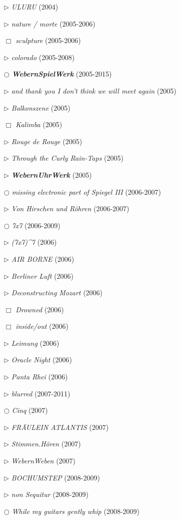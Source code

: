 \documentclass[a4paper,12pt]{article}
\begin{document}
\begin{itemize}
\item[$\rhd$] \emph{ULURU} (2004)
\item[$\rhd$] \emph{nature / morte} (2005-2006)
\item[$\Box$] \emph{sculpture} (2005-2006)
\item[$\rhd$] \emph{colorado} (2005-2008)
\item[$\bigcirc$] \textbf{\emph{WebernSpielWerk}} (2005-2015)
\item[$\rhd$] \emph{and thank you I don't think we will meet again} (2005)
\item[$\rhd$] \emph{Balkonszene} (2005)
\item[$\Box$] \emph{Kalimba} (2005)
\item[$\rhd$] \emph{Rouge de Rouge} (2005)
\item[$\rhd$] \emph{Through the Curly Rain-Taps} (2005)
\item[$\rhd$] \textbf{\emph{WebernUhrWerk}} (2005)
\item[$\bigcirc$] \emph{missing electronic part of Spiegel III} (2006-2007)
\item[$\rhd$] \emph{Von Hirschen und Röhren} (2006-2007)
\item[$\bigcirc$] \emph{7x7} (2006-2009)
\item[$\rhd$] \emph{(7x7)\^{}7} (2006)
\item[$\rhd$] \emph{AIR BORNE} (2006)
\item[$\rhd$] \emph{Berliner Luft} (2006)
\item[$\rhd$] \emph{Deconstructing Mozart} (2006)
\item[$\Box$] \emph{Drowned} (2006)
\item[$\Box$] \emph{inside/out} (2006)
\item[$\rhd$] \emph{Leimung} (2006)
\item[$\rhd$] \emph{Oracle Night} (2006)
\item[$\rhd$] \emph{Panta Rhei} (2006)
\item[$\rhd$] \emph{blurred} (2007-2011)
\item[$\bigcirc$] \emph{Cinq} (2007)
\item[$\rhd$] \emph{FRÄULEIN ATLANTIS} (2007)
\item[$\rhd$] \emph{Stimmen.Hören} (2007)
\item[$\rhd$] \emph{WebernWeben} (2007)
\item[$\rhd$] \emph{BOCHUMSTEP} (2008-2009)
\item[$\rhd$] \emph{non Sequitur} (2008-2009)
\item[$\bigcirc$] \emph{While my guitars gently whip} (2008-2009)

\end{itemize}
\end{document}
